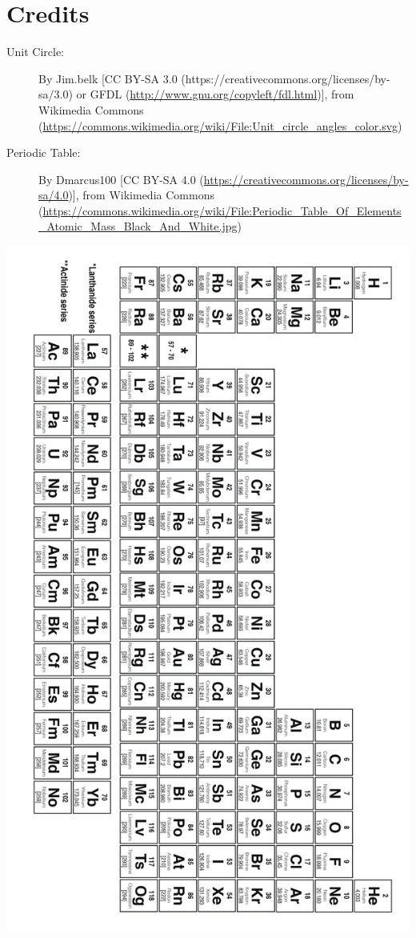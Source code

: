 \documentclass[]{report}
\begin{document}
\section{Credits}

\begin{description}
\item [Unit Circle:] By Jim.belk [CC BY-SA 3.0 (https://creativecommons.org/licenses/by-sa/3.0) or GFDL (\url{http://www.gnu.org/copyleft/fdl.html})], from Wikimedia Commons (\url{https://commons.wikimedia.org/wiki/File:Unit_circle_angles_color.svg})
\item [Periodic Table:] By Dmarcus100 [CC BY-SA 4.0 (\url{https://creativecommons.org/licenses/by-sa/4.0})], from Wikimedia Commons (\url{https://commons.wikimedia.org/wiki/File:Periodic_Table_Of_Elements_Atomic_Mass_Black_And_White.jpg})
\end{description}

\newpage
\includegraphics[]{Periodic_Table_Of_Elements_Atomic_Mass_Black_And_White.jpg}
\restoregeometry
\newpage
\end{document}
